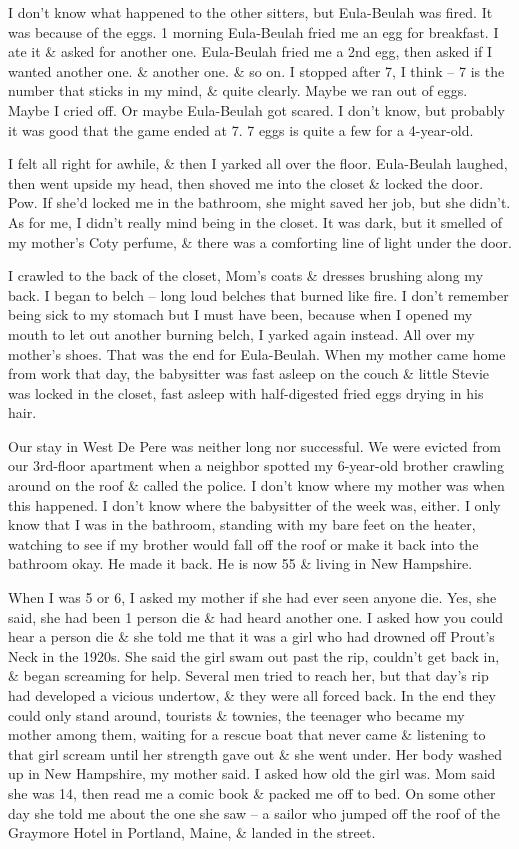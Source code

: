\documentclass{article}
\numberwithin{equation}{section}
\begin{document}
I don't know what happened to the other sitters, but Eula-Beulah was fired. It was because of the eggs. 1 morning Eula-Beulah fried me an egg for breakfast. I ate it \& asked for another one. Eula-Beulah fried me a 2nd egg, then asked if I wanted another one. \& another one. \& so on. I stopped after 7, I think -- 7 is the number that sticks in my mind, \& quite clearly. Maybe we ran out of eggs. Maybe I cried off. Or maybe Eula-Beulah got scared. I don't know, but probably it was good that the game ended at 7. 7 eggs is quite a few for a 4-year-old.

I felt all right for awhile, \& then I yarked all over the floor. Eula-Beulah laughed, then went upside my head, then shoved me into the closet \& locked the door. Pow. If she'd locked me in the bathroom, she might saved her job, but she didn't. As for me, I didn't really mind being in the closet. It was dark, but it smelled of my mother's Coty perfume, \& there was a comforting line of light under the door.

I crawled to the back of the closet, Mom's coats \& dresses brushing along my back. I began to belch -- long loud belches that burned like fire. I don't remember being sick to my stomach but I must have been, because when I opened my mouth to let out another burning belch, I yarked again instead. All over my mother's shoes. That was the end for Eula-Beulah. When my mother came home from work that day, the babysitter was fast asleep on the couch \& little Stevie was locked in the closet, fast asleep with half-digested fried eggs drying in his hair.

 Our stay in West De Pere was neither long nor successful. We were evicted from our 3rd-floor apartment when a neighbor spotted my 6-year-old brother crawling around on the roof \& called the police. I don't know where my mother was when this happened. I don't know where the babysitter of the week was, either. I only know that I was in the bathroom, standing with my bare feet on the heater, watching to see if my brother would fall off the roof or make it back into the bathroom okay. He made it back. He is now 55 \& living in New Hampshire.

 When I was 5 or 6, I asked my mother if she had ever seen anyone die. Yes, she said, she had been 1 person die \& had heard another one. I asked how you could hear a person die \& she told me that it was a girl who had drowned off Prout's Neck in the 1920s. She said the girl swam out past the rip, couldn't get back in, \& began screaming for help. Several men tried to reach her, but that day's rip had developed a vicious undertow, \& they were all forced back. In the end they could only stand around, tourists \& townies, the teenager who became my mother among them, waiting for a rescue boat that never came \& listening to that girl scream until her strength gave out \& she went under. Her body washed up in New Hampshire, my mother said. I asked how old the girl was. Mom said she was 14, then read me a comic book \& packed me off to bed. On some other day she told me about the one she saw -- a sailor who jumped off the roof of the Graymore Hotel in Portland, Maine, \& landed in the street.
\end{document}
